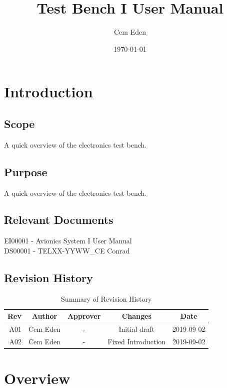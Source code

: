 \documentclass[12pt,article]{memoir}
\title{Test Bench I User Manual}
\author{Cem Eden}
\date{\today}
\begin{document}
	


\tableofcontents*
\clearpage


\chapter{Introduction}
\section{Scope}
A quick overview of the electronics test bench.

\section{Purpose}
A quick overview of the electronics test bench.

\section{Relevant Documents}
EI00001 - Avionics System I User Manual\\
DS00001 - TELXX-YYWW\_CE Conrad

\section{Revision History}
\begin{table}[H]
	\centering
	\begin{tabu}{r || c | c | c | c }
		Rev & Author & Approver & Changes & Date\\ \hline
		A01 & Cem Eden & - & Initial draft & 2019-09-02\\
		A02 & Cem Eden & - & Fixed Introduction & 2019-09-02\\
	\end{tabu}
	\caption{Summary of Revision History}
	\label{tab:rev}
\end{table}


\newpage
\chapter{Overview}
\end{document}
